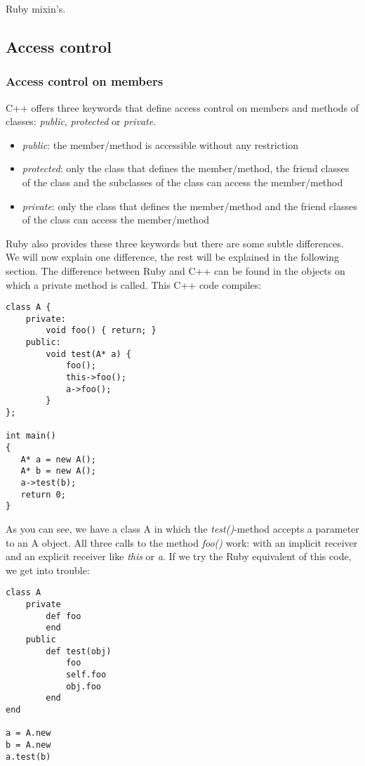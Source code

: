 \documentclass[10pt,a4paper,twocolumn]{article}
\begin{document}
Ruby mixin's.

\subsection{Access control}

\subsubsection{Access control on members}
C++ offers three keywords that define access control on members and methods of classes: \textit{public}, \textit{protected} or \textit{private}. 

\begin{itemize}
\item \textit{public}: the member/method is accessible without any restriction
\item \textit{protected}: only the class that defines the member/method, the friend classes of the class and the subclasses of the class can access the member/method
\item \textit{private}: only the class that defines the member/method and the friend classes of the class can access the member/method
\end{itemize}

Ruby also provides these three keywords but there are some subtle differences. We will now explain one difference, the rest will be explained in the following section. The difference between Ruby and C++ can be found in the objects on which a private method is called. This C++ code compiles:

\begin{lstlisting}
class A {
	private:
		void foo() { return; }
	public:
		void test(A* a) {
			foo();
			this->foo();
			a->foo();
		}
};
 
int main()
{
   A* a = new A();
   A* b = new A();
   a->test(b);
   return 0;
}
\end{lstlisting}

As you can see, we have a class A in which the \textit{test()}-method accepts a parameter to an A object. All three calls to the method \textit{foo()} work: with an implicit receiver and an explicit receiver like \textit{this} or \textit{a}. If we try the Ruby equivalent of this code, we get into trouble:

\begin{lstlisting}
class A
	private
		def foo
		end
	public
		def test(obj)
			foo
			self.foo
			obj.foo
		end
end

a = A.new
b = A.new
a.test(b)
\end{lstlisting}
\end{document}
